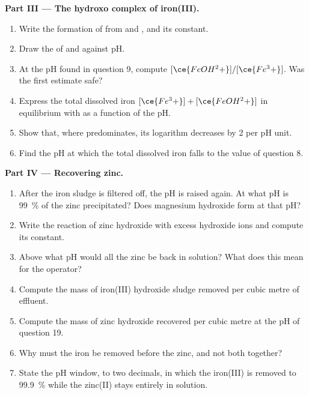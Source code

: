 \begin{problem}
\medskip
\noindent\textbf{Part III --- The hydroxo complex of iron(III).}
\begin{enumerate}[resume]
  \item Write the formation of  from  and ,
        and its constant.
  \item Draw the  of  and 
        against pH.
  \item At the pH found in question 9, compute
        $[\ce{FeOH^2+}]/[\ce{Fe^3+}]$. Was the first estimate safe?
  \item Express the total dissolved iron $[\ce{Fe^3+}] + [\ce{FeOH^2+}]$
        in equilibrium with  as a function of the pH.
  \item Show that, where  predominates, its logarithm
        decreases by 2 per pH unit.
  \item Find the pH at which the total dissolved iron falls to the value
        of question 8.
\end{enumerate}

\medskip
\noindent\textbf{Part IV --- Recovering zinc.}
\begin{enumerate}[resume]
  \item After the iron sludge is filtered off, the pH is raised again. At
        what pH is \qty{99}{\percent} of the zinc precipitated? Does magnesium
        hydroxide form at that pH?
  \item Write the reaction of zinc hydroxide with excess hydroxide ions
        and compute its constant.
  \item Above what pH would all the zinc be back in solution? What does
        this mean for the operator?
  \item Compute the mass of iron(III) hydroxide sludge removed per cubic
        metre of effluent.
  \item Compute the mass of zinc hydroxide recovered per cubic metre at
        the pH of question 19.
  \item Why must the iron be removed before the zinc, and not both
        together?
  \item State the pH window, to two decimals, in which the iron(III) is
        removed to \qty{99.9}{\percent} while the zinc(II) stays entirely in
        solution.
\end{enumerate}
\end{problem}
